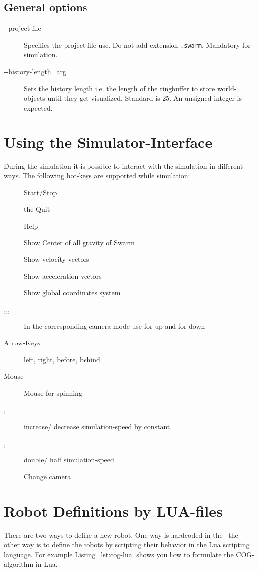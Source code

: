\documentclass[a4paper,halfparskip,11pt,twoside]{scrartcl}
\begin{document}
\subsection{General options}
\begin{description}
	\item [-{}-project-file] Specifies the project file use. Do not add extension {\tt .swarm}. Mandatory for simulation.
	\item [-{}-history-length=arg] Sets the history length i.e. the length of the ringbuffer to store world-objects until they get visualized. Standard is 25. An unsigned integer is expected.
\end{description}


\section{Using the Simulator-Interface}
During the simulation it is possible to interact with the simulation in different ways. The following hot-keys are supported while simulation:

\begin{description}
	\item [] Start/Stop
	\item [] the Quit \RSS\
	\item [] Help
	\item [] Show Center of all gravity of Swarm
	\item [] Show velocity vectors
	\item [] Show acceleration vectors
	\item [] Show global coordinates system
	\item [,,,] In the corresponding camera mode use  for up  and  for down %
	\item [Arrow-Keys] left, right, before, behind
	\item [Mouse] Mouse for spinning
	\item [\fbox{\tt +}, \fbox{\tt -}] increase/ decrease simulation-speed by constant
	\item [\fbox{\tt *},\fbox{\tt /}] double/ half simulation-speed
	\item [] Change camera
\end{description}

\section{Robot Definitions by LUA-files}
There are two ways to define a new robot. One way is hardcoded in the \RSS\, the other way is to define the robots by scripting their behavior in the {\sffamily Lua} scripting language. For example Listing~\ref{lst:cog-lua} shows you how to formulate the COG-algorithm in Lua.
\end{document}
